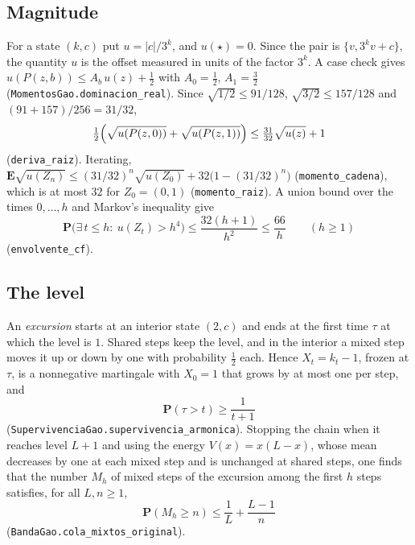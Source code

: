 \documentclass[11pt]{amsart}
\theoremstyle{definition}
\theoremstyle{remark}
\newcommand{\Prob}{\mathbf{P}}
\newcommand{\E}{\mathbf{E}}
\newcommand{\fus}{\star}
\newcommand{\lean}[1]{\nolinkurl{#1}}
\begin{document}
\subsection{Magnitude}
For a state $(k,c)$ put $u=|c|/3^k$, and $u(\fus)=0$. Since the pair is $\{v,3^kv+c\}$, the quantity $u$ is the offset measured in units of the factor $3^k$. A case check gives $u(P(z,b))\le A_b\,u(z)+\tfrac12$ with $A_0=\tfrac12$, $A_1=\tfrac32$ (\lean{MomentosGao.dominacion_real}). Since $\sqrt{1/2}\le 91/128$, $\sqrt{3/2}\le 157/128$ and $(91+157)/256=31/32$,
\[
\tfrac12\Bigl(\sqrt{u(P(z,0))}+\sqrt{u(P(z,1))}\Bigr)\le \tfrac{31}{32}\sqrt{u(z)}+1
\]
(\lean{deriva_raiz}). Iterating, $\E\sqrt{u(Z_n)}\le (31/32)^n\sqrt{u(Z_0)}+32\bigl(1-(31/32)^n\bigr)$ (\lean{momento_cadena}), which is at most $32$ for $Z_0=(0,1)$ (\lean{momento_raiz}). A union bound over the times $0,\dots,h$ and Markov's inequality give
\begin{equation}\label{eq:C1}
\Prob\bigl(\exists\, t\le h:\ u(Z_t)>h^4\bigr)\le \frac{32(h+1)}{h^2}\le\frac{66}{h}\qquad(h\ge1)
\end{equation}
(\lean{envolvente_cf}).

\subsection{The level}
An \emph{excursion} starts at an interior state $(2,c)$ and ends at the first time $\tau$ at which the level is $1$. Shared steps keep the level, and in the interior a mixed step moves it up or down by one with probability $\tfrac12$ each. Hence $X_t=k_t-1$, frozen at $\tau$, is a nonnegative martingale with $X_0=1$ that grows by at most one per step, and
\begin{equation}\label{eq:H1}
\Prob(\tau>t)\ge \frac1{t+1}
\end{equation}
(\lean{SupervivenciaGao.supervivencia_armonica}). Stopping the chain when it reaches level $L+1$ and using the energy $V(x)=x(L-x)$, whose mean decreases by one at each mixed step and is unchanged at shared steps, one finds that the number $M_h$ of mixed steps of the excursion among the first $h$ steps satisfies, for all $L,n\ge1$,
\begin{equation}\label{eq:H2}
\Prob(M_h\ge n)\le \frac1L+\frac{L-1}{n}
\end{equation}
(\lean{BandaGao.cola_mixtos_original}).
\end{document}
